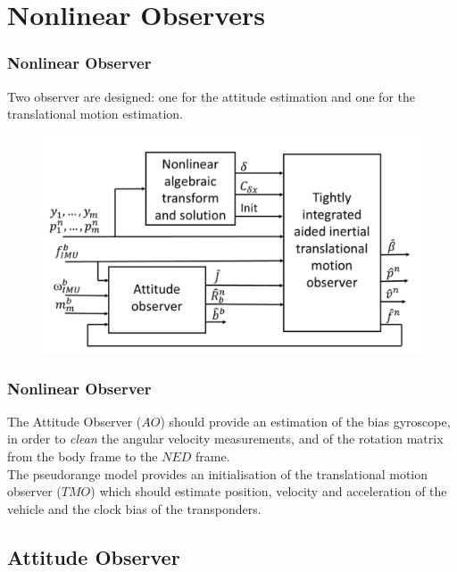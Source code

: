 \documentclass{beamer}
\begin{document}
\section{Nonlinear Observers}
	\begin{frame}
	\frametitle{Nonlinear Observer}
	Two observer are designed: one for the attitude estimation and one for the translational motion estimation. 
		\begin{figure}[H]
		\centering
		\includegraphics[scale=0.3]{observers}
	\end{figure}
	\end{frame}

	\begin{frame}
		\frametitle{Nonlinear Observer}
		The Attitude Observer ($AO$) should provide an estimation of the bias gyroscope, in order to \textit{clean} the angular velocity measurements, and of the rotation matrix from the body frame to the $NED$ frame.\\
		\vspace{0.3cm}
		The pseudorange model provides an initialisation of the translational motion observer ($TMO$) which should estimate position, velocity and acceleration of the vehicle and the clock bias of the transponders.
	\end{frame}
\subsection{Attitude Observer}
\end{document}
